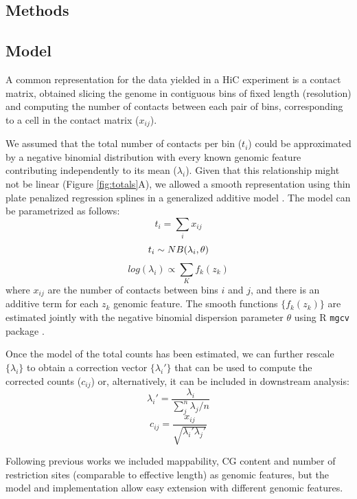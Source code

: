 \documentclass{bioinfo}
\begin{document}
\begin{methods}

\section{Methods}

\subsection{Model}

A common representation for the data yielded in a HiC experiment is a contact matrix, obtained slicing the genome in contiguous bins of fixed length (resolution) and computing the number of contacts between each pair of bins, corresponding to a cell in the contact matrix ($x_{ij}$).

We assumed that the total number of contacts per bin ($t_{i}$) could be approximated by a negative binomial distribution with every known genomic feature contributing independently to its mean ($\lambda_i$). Given that this relationship might not be linear (Figure \ref{fig:totals}A), we allowed a smooth representation using thin plate penalized regression splines \citep{wood2003thin} in a generalized additive model \citep{wood2011fast}. The model can be parametrized as follows:
$$
t_i = \sum_{i}{x_{ij}}
$$
$$
t_i \sim NB(\lambda_i, \theta) \\
$$
$$
log(\lambda_i) \propto \sum_{K}{f_k(z_k)}
$$
where $x_{ij}$ are the number of contacts between bins $i$ and $j$, and there is an additive term for each $z_k$ genomic feature. The smooth functions $\{f_k(z_k)\}$ are estimated jointly with the negative binomial dispersion parameter $\theta$ using R \citep{coreteam2014r} \texttt{mgcv} package \citep{wood2011fast}.

Once the model of the total counts has been estimated, we can further rescale  $\{\lambda_i\}$ to obtain a correction vector $\{\lambda_i'\}$ that can be used to compute the corrected counts ($c_{ij}$) or, alternatively, it can be included in downstream analysis:
$$
\lambda_i' = \frac{\lambda_i}{\sum_j^n{\lambda_j}/n}
$$
$$
c_{ij} = \frac{x_{ij}}{\sqrt{\lambda_i'\lambda_j'}}
$$

Following  previous works \citep{yaffe2011probabilistic,hu2012hicnorm} we included mappability, CG content and number of restriction sites (comparable to effective length) as genomic features, but the model and implementation allow easy extension with different genomic features.


\end{methods}
\end{document}
